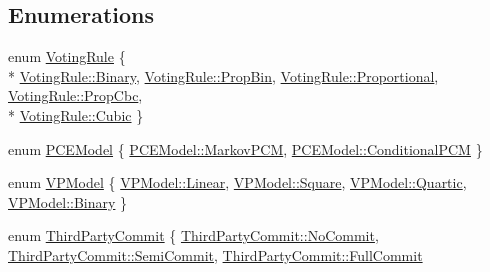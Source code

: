 \subsection*{Enumerations}
\begin{DoxyCompactItemize}
\item 
enum \hyperlink{namespace_k_base_a6430bae9b90b42e1301bb4eee587bbf3}{Voting\-Rule} \{ \\*
\hyperlink{namespace_k_base_a6430bae9b90b42e1301bb4eee587bbf3a6ce976e8f061b2b5cfe4d0c50c3405dd}{Voting\-Rule\-::\-Binary}, 
\hyperlink{namespace_k_base_a6430bae9b90b42e1301bb4eee587bbf3a960321e2a4bfda404d33114ae3d0872d}{Voting\-Rule\-::\-Prop\-Bin}, 
\hyperlink{namespace_k_base_a6430bae9b90b42e1301bb4eee587bbf3aac13b33ebc8ea372dfb07e5ed4d9655f}{Voting\-Rule\-::\-Proportional}, 
\hyperlink{namespace_k_base_a6430bae9b90b42e1301bb4eee587bbf3a5e15ea0df19eefc1ad3b8c5cc8b8576a}{Voting\-Rule\-::\-Prop\-Cbc}, 
\\*
\hyperlink{namespace_k_base_a6430bae9b90b42e1301bb4eee587bbf3aec6b5414eb175379ff9efc9b3eef5814}{Voting\-Rule\-::\-Cubic}
 \}
\item 
enum \hyperlink{namespace_k_base_a498a929a17ac96ff70afee8eb4e17cd0}{P\-C\-E\-Model} \{ \hyperlink{namespace_k_base_a498a929a17ac96ff70afee8eb4e17cd0a9eae233fc331b4eff34732e0733a30ca}{P\-C\-E\-Model\-::\-Markov\-P\-C\-M}, 
\hyperlink{namespace_k_base_a498a929a17ac96ff70afee8eb4e17cd0a768e3b180662caca78eb3396dbc8cd71}{P\-C\-E\-Model\-::\-Conditional\-P\-C\-M}
 \}
\item 
enum \hyperlink{namespace_k_base_a7dac0bfa8a690bf0b88dc620a7ac2d71}{V\-P\-Model} \{ \hyperlink{namespace_k_base_a7dac0bfa8a690bf0b88dc620a7ac2d71a32a843da6ea40ab3b17a3421ccdf671b}{V\-P\-Model\-::\-Linear}, 
\hyperlink{namespace_k_base_a7dac0bfa8a690bf0b88dc620a7ac2d71aceb46ca115d05c51aa5a16a8867c3304}{V\-P\-Model\-::\-Square}, 
\hyperlink{namespace_k_base_a7dac0bfa8a690bf0b88dc620a7ac2d71a884b16485227c5da72c09b668fd7e1da}{V\-P\-Model\-::\-Quartic}, 
\hyperlink{namespace_k_base_a7dac0bfa8a690bf0b88dc620a7ac2d71a6ce976e8f061b2b5cfe4d0c50c3405dd}{V\-P\-Model\-::\-Binary}
 \}
\item 
enum \hyperlink{namespace_k_base_aca1021042b887fdf10cc3d6b0f9cef06}{Third\-Party\-Commit} \{ \hyperlink{namespace_k_base_aca1021042b887fdf10cc3d6b0f9cef06ac4cc4977453ba95b09b99c55ae960a63}{Third\-Party\-Commit\-::\-No\-Commit}, 
\hyperlink{namespace_k_base_aca1021042b887fdf10cc3d6b0f9cef06afae7a8b68beff6a21c500b876e58db0c}{Third\-Party\-Commit\-::\-Semi\-Commit}, 
\hyperlink{namespace_k_base_aca1021042b887fdf10cc3d6b0f9cef06a1e95f5f14b87d3682d6159293f5152bf}{Third\-Party\-Commit\-::\-Full\-Commit}

\end{DoxyCompactItemize}
